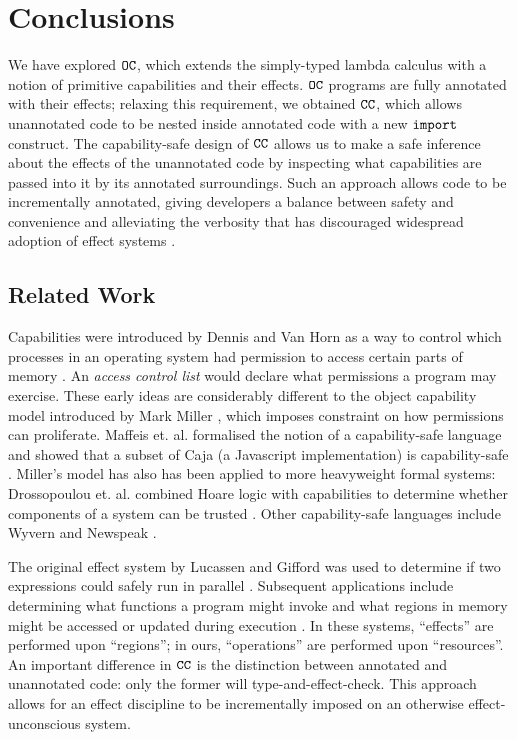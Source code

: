 
\section{Conclusions}

We have explored $\mathtt{OC}$, which extends the simply-typed lambda calculus with a notion of primitive capabilities and their effects. $\mathtt{OC}$ programs are fully annotated with their effects; relaxing this requirement, we obtained $\mathtt{CC}$, which allows unannotated code to be nested inside annotated code with a new $\mathtt{import}$ construct. The capability-safe design of $\mathtt{CC}$ allows us to make a safe inference about the effects of the unannotated code by inspecting what capabilities are passed into it by its annotated surroundings. Such an approach allows code to be incrementally annotated, giving developers a balance between safety and convenience and alleviating the verbosity that has discouraged widespread adoption of effect systems \cite{rytz2012}.

\subsection{Related Work}

Capabilities were introduced by Dennis and Van Horn as a way to control which processes in an operating system had permission to access certain parts of memory \cite{dennis66}. An \textit{access control list} would declare what permissions a program may exercise. These early ideas are considerably different to the object capability model introduced by Mark Miller \cite{miller06}, which imposes constraint on how permissions can proliferate. Maffeis et. al. formalised the notion of a capability-safe language and showed that a subset of Caja (a Javascript implementation) is capability-safe \cite{maffeis10}. Miller's model has also has been applied to more heavyweight formal systems: Drossopoulou et. al. combined Hoare logic with capabilities to determine whether components of a system can be trusted \cite{drossopoulou07}. Other capability-safe languages include Wyvern \cite{nistor13} and Newspeak \cite{bracha10}.

The original effect system by Lucassen and Gifford was used to determine if two expressions could safely run in parallel \cite{lucassen88}. Subsequent applications include determining what functions a program might invoke \cite{tang94} and what regions in memory might be accessed or updated during execution \cite{talpin94}. In these systems, ``effects'' are performed upon ``regions''; in ours, ``operations'' are performed upon ``resources''. An important difference in $\mathtt{CC}$ is the distinction between annotated and unannotated code: only the former will type-and-effect-check. This approach allows for an effect discipline to be incrementally imposed on an otherwise effect-unconscious system.

